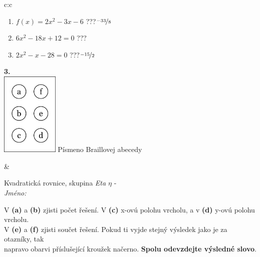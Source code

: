 \documentclass[10pt]{report}
\begin{document}
\begin{tabular}{c:c}
\begin{minipage}[c][104.5mm][t]{0.5\linewidth}
\begin{center}
\begin{minipage}{0.79\linewidth}
\begin{center}
\begin{varwidth}{\linewidth}
\begin{enumerate}
\item $f(x)=2x^2-3x-6$\quad \dotfill\; ???\;\dotfill \quad $\nicefrac{-33}{8}$
\item $6x^2-18x+12=0$\quad \dotfill\; ???\;\dotfill {}
\item $2x^2-x-28=0$\quad \dotfill\; ???\;\dotfill \quad $\nicefrac{-15}{2}$
\end{enumerate}
\end{varwidth}
\end{center}
\end{minipage}
\begin{minipage}{0.20\linewidth}
\begin{center}
{\Huge\bfseries 3.} \\[2mm]
\includegraphics[height=40mm]{../images/braille.png}
{\small Písmeno Braillovej abecedy}
\end{center}
\end{minipage}
\end{center}
\end{minipage}
&
\begin{minipage}[c][104.5mm][t]{0.5\linewidth}
\begin{center}
\vspace{7mm}
{\huge Kvadratická rovnice, skupina \textit{Eta $\eta$} -}\\[5mm]
\textit{Jméno:}\phantom{xxxxxxxxxxxxxxxxxxxxxxxxxxxxxxxxxxxxxxxxxxxxxxxxxxxxxxxxxxxxxxxxx}\\[5mm]
\begin{minipage}{0.95\linewidth}
\begin{center}
V \textbf{(a)} a \textbf{(b)} zjisti počet řešení. V \textbf{(c)} x-ovú polohu vrcholu, a v \textbf{(d)} y-ovú polohu vrcholu.\\V \textbf{(e)} a \textbf{(f)} zjisti součet řešení. Pokud ti vyjde stejný výsledek jako je za otazníky, tak\\napravo obarvi příslušející kroužek načerno. \textbf{Spolu odevzdejte výsledné slovo}.
\end{center}
\end{minipage}
\\[1mm]

\end{center}
\end{minipage}
\end{tabular}
\end{document}
